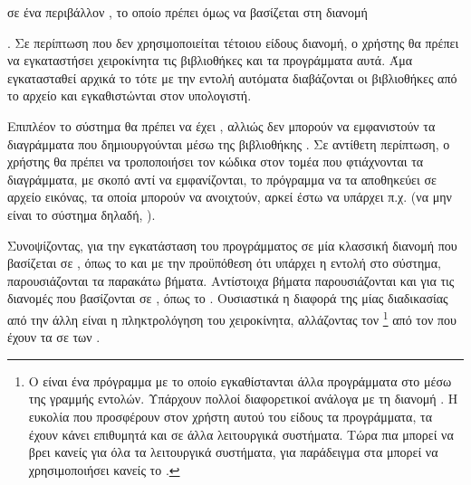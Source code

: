 \documentclass[12pt]{report}
\begin{document}
σε ένα περιβάλλον {}, το οποίο πρέπει όμως να βασίζεται στη διανομή {{}. Σε περίπτωση που δεν χρησιμοποιείται τέτοιου είδους διανομή, ο χρήστης θα πρέπει να εγκαταστήσει χειροκίνητα τις βιβλιοθήκες και τα προγράμματα αυτά. 
Άμα εγκατασταθεί αρχικά το {} τότε με την εντολή {} αυτόματα διαβάζονται οι βιβλιοθήκες από το αρχείο και εγκαθιστώνται στον υπολογιστή.

{}

Επιπλέον το σύστημα θα πρέπει να έχει {}, αλλιώς δεν μπορούν να εμφανιστούν τα διαγράμματα που δημιουργούνται μέσω της βιβλιοθήκης {}.
Σε αντίθετη περίπτωση, ο χρήστης θα πρέπει να τροποποιήσει τον κώδικα στον τομέα που φτιάχνονται τα διαγράμματα, με σκοπό αντί να εμφανίζονται, το πρόγραμμα να τα αποθηκεύει σε αρχείο εικόνας, τα οποία μπορούν
να ανοιχτούν, αρκεί έστω να υπάρχει {} π.χ. {} (να μην είναι το σύστημα δηλαδή, {}).

Συνοψίζοντας, για την εγκατάσταση του προγράμματος σε μία κλασσική διανομή που βασίζεται σε {}, όπως το {} και με την προϋπόθεση ότι υπάρχει η εντολή {} στο σύστημα, παρουσιάζονται
τα παρακάτω βήματα. Αντίστοιχα βήματα παρουσιάζονται και για τις διανομές που βασίζονται σε {}, όπως το {}. Ουσιαστικά η διαφορά της μίας διαδικασίας από την άλλη 
είναι η πληκτρολόγηση του {} χειροκίνητα, αλλάζοντας τον {}\footnote{Ο {} είναι ένα πρόγραμμα με το οποίο εγκαθίστανται άλλα προγράμματα στο 
{} μέσω της γραμμής εντολών. Υπάρχουν πολλοί διαφορετικοί {} ανάλογα με τη διανομή {}. Η ευκολία που προσφέρουν στον χρήστη αυτού του είδους τα προγράμματα, τα έχουν κάνει επιθυμητά και σε άλλα λειτουργικά συστήματα. Τώρα πια μπορεί να βρει κανείς {} για όλα τα λειτουργικά συστήματα, για παράδειγμα στα {} μπορεί να χρησιμοποιήσει κανείς το 
{}.} από τον {} που έχουν τα {} σε {} των {}. 

}
\end{document}
